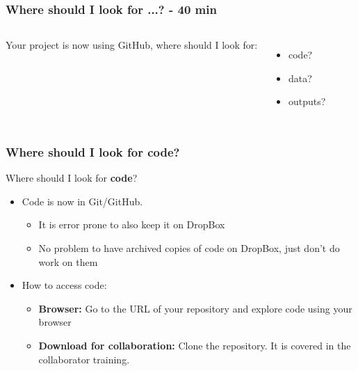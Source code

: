 \documentclass[aspectratio=169]{beamer} %
\begin{document}
\begin{frame}
	\frametitle{Where should I look for ...? - 40 min}

	\begin{columns}[c]


		\Large Your project is now using GitHub, where should I look for:

		\vspace{0.5cm}

		\begin{itemize}
			\item code?
			\item data?
			\item outputs?
		\end{itemize}


	\end{columns}
\end{frame}

\begin{frame}
	\frametitle{Where should I look for code?}

	Where should I look for \textbf{code}?

	\begin{itemize}
		\item Code is now in Git/GitHub.
		\begin{itemize}
			\item It is error prone to also keep it on DropBox
			\item No problem to have archived copies of code on DropBox, just don't do work on them
		\end{itemize}
		\item How to access code:
		\begin{itemize}
			\item \textbf{Browser:} Go to the URL of your repository and explore code using your browser
			\item \textbf{Download for collaboration:} Clone the repository. It is covered in the collaborator training.
		\end{itemize}
	\end{itemize}
\end{frame}
\end{document}
